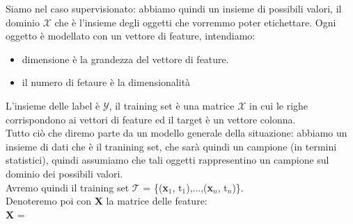 \documentclass[12pt, oneside]{extbook}
\begin{document}
Siamo nel caso supervisionato: abbiamo quindi un insieme di possibili valori, il dominio $\mathscr{X}$ che è l'insieme degli oggetti che vorremmo poter etichettare. Ogni oggetto è modellato con un vettore di feature, intendiamo:
\begin{itemize}
	\item dimensione è la grandezza del vettore di feature.
	\item il numero di fetaure è la dimensionalità
\end{itemize}
L'insieme delle label è $\mathscr{Y}$, il training set è una matrice $\mathscr{X}$ in cui le righe corrispondono ai vettori di feature ed il target è un vettore colonna.\\Tutto ciò che diremo parte da un modello generale della situazione: abbiamo un insieme di dati che è il tranining set, che sarà quindi un campione (in termini statistici), quindi assumiamo che tali oggetti rappresentino un campione sul dominio dei possibili valori.\\Avremo quindi il training set 
$\mathscr{T}$ = \{(\textbf{x$_1$}, t$_1$),...,(\textbf{x$_n$}, t$_n$)\}.\\Denoteremo poi con \textbf{X} la matrice delle feature:\\
\textbf{X} = 
\end{document}
